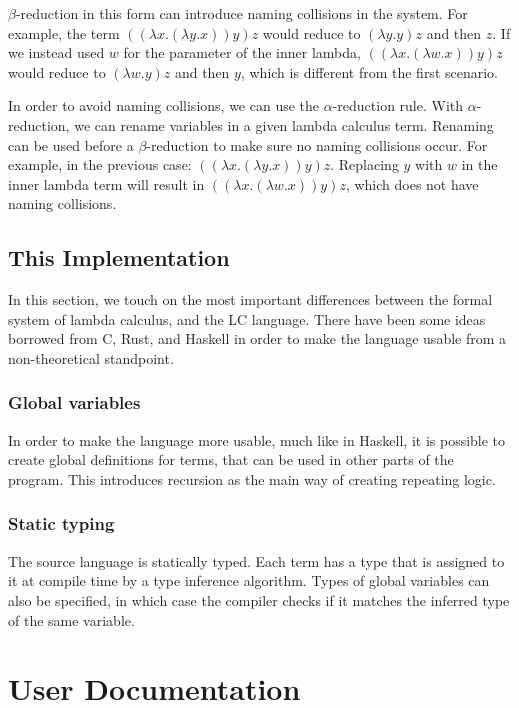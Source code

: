 \documentclass[12pt]{article}
\begin{document}
$\beta$-reduction in this form can introduce naming collisions in the system.
For example, the term $((\lambda x. (\lambda y. x)) y) z$ would reduce to
$(\lambda y. y) z$ and then $z$. If we instead used $w$ for the parameter of the
inner lambda, $((\lambda x. (\lambda w. x)) y) z$ would reduce to $(\lambda w.
y) z$ and then $y$, which is different from the first scenario.
\cite{lambda-calculus-rewriting-problems}

In order to avoid naming collisions, we can use the $\alpha$-reduction rule.
With $\alpha$-reduction, we can rename variables in a given lambda calculus
term. Renaming can be used before a $\beta$-reduction to make sure no naming
collisions occur. For example, in the previous case: $((\lambda x. (\lambda y.
x)) y) z$. Replacing $y$ with $w$ in the inner lambda term will result in
$((\lambda x. (\lambda w. x)) y) z$, which does not have naming collisions.


\subsection{This Implementation}

In this section, we touch on the most important differences between the formal
system of lambda calculus, and the LC language. There have been some ideas
borrowed from C, Rust, and Haskell in order to make the language usable from a
non-theoretical standpoint.

\subsubsection{Global variables}

In order to make the language more usable, much like in Haskell, it is possible
to create global definitions for terms, that can be used in other parts of the
program. This introduces recursion as the main way of creating repeating logic.

\subsubsection{Static typing}

The source language is statically typed. Each term has a type that is assigned
to it at compile time by a type inference algorithm. Types of global variables
can also be specified, in which case the compiler checks if it matches the
inferred type of the same variable.

\pagebreak
\section{User Documentation}
\end{document}
